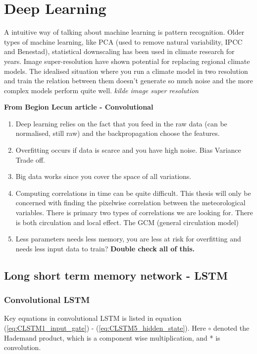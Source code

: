 \section{Deep Learning}
A intuitive way of talking about machine learning is pattern recognition. Older types of machine learning, like PCA (used to remove natural variability, IPCC and Benestad), statistical downscaling has been used in climate research for years. Image super-resolution have shown potential for replacing regional climate models. The idealised situation where you run a climate model in two resolution and train the relation between them doesn't generate so much noise and the more complex models perform quite well. \textit{kilde image super resolution}

\textbf{From Begion Lecun article - Convolutional}
\begin{enumerate}
    \item Deep learning relies on the fact that you feed in the raw data (can be normalised, still raw) and the backpropagation choose the features.
    \item Overfitting occurs if data is scarce and you have high noise. Bias Variance Trade off.
    \item Big data works since you cover the space of all variations. 
    \item Computing correlations in time can be quite difficult. This thesis will only be concerned with finding the pixelwise correlation between the meteorological variables. There is primary two types of correlations we are looking for. There is both circulation and local effect. The GCM (general circulation model)
    \item Less parameters needs  less memory, you are less at risk for overfitting and needs less input data to train? \textbf{Double check all of this.}
\end{enumerate}

\subsection{Long short term memory network - LSTM}



\subsubsection{Convolutional LSTM}
\label{sec:conv_lstm}
Key equations in convolutional LSTM is listed in equation (\ref{eq:CLSTM1_input_gate}) - (\ref{eq:CLSTM5_hidden_state}). Here $\circ$ denoted the Hademand product, which is a component wise multiplication, and * is convolution. 



